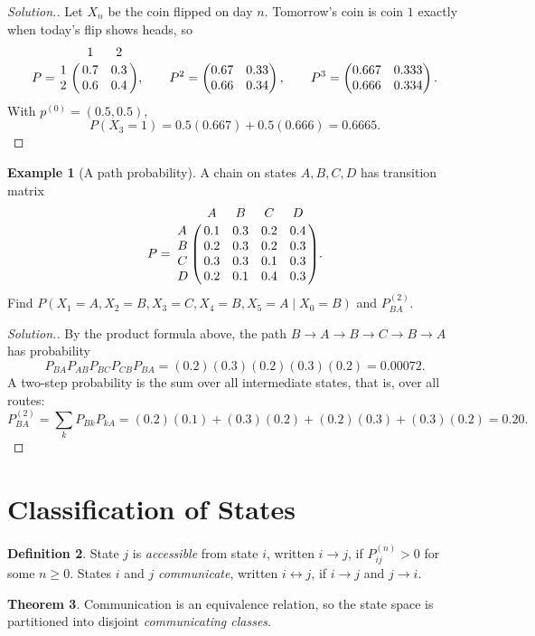 \documentclass[12pt,a4paper]{report}
\theoremstyle{definition}
\newtheorem{thm}{Theorem}[section]
\newtheorem{defn}[thm]{Definition}
\newtheorem{exa}[thm]{Example}
\newenvironment{solution}
  {\renewcommand{\qedsymbol}{}\begin{proof}[\textit{Solution}.]}
  {\end{proof}}
\begin{document}
\begin{solution}
Let $X_n$ be the coin flipped on day $n$. Tomorrow's coin is coin $1$ exactly when today's
flip shows heads, so
\[P = \bordermatrix{~ & 1 & 2\cr 1 & 0.7 & 0.3\cr 2 & 0.6 & 0.4\cr},\qquad
P^2 = \begin{pmatrix}0.67 & 0.33\\ 0.66 & 0.34\end{pmatrix},\qquad
P^3 = \begin{pmatrix}0.667 & 0.333\\ 0.666 & 0.334\end{pmatrix}.\]
With $p^{(0)} = (0.5, 0.5)$,
\[P(X_3 = 1) = 0.5(0.667) + 0.5(0.666) = 0.6665 .\]
\end{solution}

\begin{exa}[A path probability]
\label{ex:path}
A chain on states $A, B, C, D$ has transition matrix
\[P = \bordermatrix{~ & A & B & C & D\cr
A & 0.1 & 0.3 & 0.2 & 0.4\cr
B & 0.2 & 0.3 & 0.2 & 0.3\cr
C & 0.3 & 0.3 & 0.1 & 0.3\cr
D & 0.2 & 0.1 & 0.4 & 0.3\cr} .\]
Find $P(X_1 = A, X_2 = B, X_3 = C, X_4 = B, X_5 = A\mid X_0 = B)$ and $P_{BA}^{(2)}$.
\end{exa}

\begin{solution}
By the product formula above, the path $B\to A\to B\to C\to B\to A$ has probability
\[P_{BA}P_{AB}P_{BC}P_{CB}P_{BA} = (0.2)(0.3)(0.2)(0.3)(0.2) = 0.00072 .\]
A two-step probability is the sum over all intermediate states, that is, over all routes:
\[P_{BA}^{(2)} = \sum_kP_{Bk}P_{kA} = (0.2)(0.1) + (0.3)(0.2) + (0.2)(0.3) + (0.3)(0.2) = 0.20 .\]
\end{solution}

\section{Classification of States}

\begin{defn}
\label{def:accessible}
State $j$ is \emph{accessible} from state $i$, written $i\to j$, if $P_{ij}^{(n)}>0$ for some
$n\geq 0$. States $i$ and $j$ \emph{communicate}, written $i\leftrightarrow j$, if $i\to j$ and
$j\to i$.
\end{defn}

\begin{thm}
\label{thm:classes}
Communication is an equivalence relation, so the state space is partitioned into disjoint
\emph{communicating classes}.
\end{thm}
\end{document}
